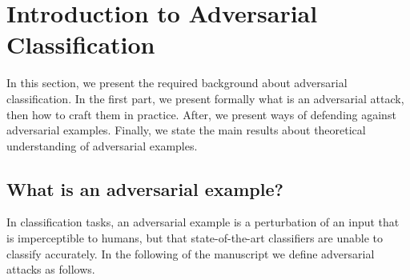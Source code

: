 
\section{Introduction to Adversarial Classification}

In this section, we present the required background about adversarial classification. In the first part, we present formally what is an adversarial attack, then how to craft them in practice. After, we present ways of defending against adversarial examples. Finally, we state the main results about theoretical understanding of adversarial examples. 
\subsection{What is an adversarial example?}

In classification tasks, an adversarial example is a perturbation of an input that is imperceptible to humans, but that state-of-the-art classifiers are unable to  classify accurately. In the following of the manuscript we define adversarial attacks as follows.


